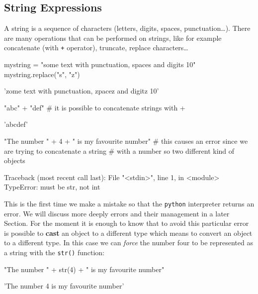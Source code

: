\subsection{String Expressions}\label{string-expressions}

A string is a sequence of characters (letters, digits, spaces, punctuation\ldots). There are many operations that can be performed on strings, like for example concatenate (with \texttt{+} operator), truncate, replace characters\ldots

\begin{ipython}
mystring = "some text with punctuation, spaces and digits 10" 
mystring.replace("s", "z")
\end{ipython}
\begin{ioutput}
'zome text with punctuation, zpacez and digitz 10'
\end{ioutput}

\begin{ipython}
"abc" + "def" # it is possible to concatenate strings with + 
\end{ipython}
\begin{ioutput}
'abcdef'
\end{ioutput}

\begin{ipython}
"The number " + 4 + " is my favourite number"
# this causes an error since we are trying to concatenate a string
# with a number so two different kind of objects
\end{ipython}
\begin{ioutput} 
Traceback (most recent call last):
  File "<stdin>", line 1, in <module>
TypeError: must be str, not int
\end{ioutput}

This is the first time we make a mistake so that the \texttt{python} interpreter returns an error. We will 
discuss more deeply errors and their management in a later Section. 
For the moment it is enough to know that to avoid this particular error is possible to \textbf{cast} an object to a 
different type which means to convert an object to a different type. In this case we can \emph{force} the number four to be represented as a string with the \texttt{str()} function:

\begin{ipython}
"The number " + str(4) + " is my favourite number"
\end{ipython}
\begin{ioutput}
'The number 4 is my favourite number'
\end{ioutput}

